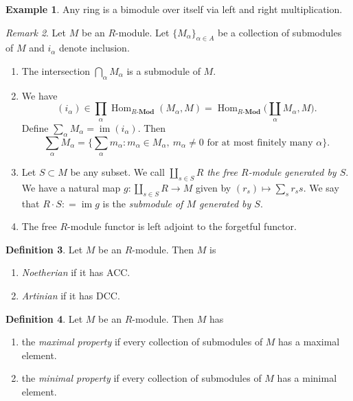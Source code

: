 \documentclass[10pt,letterpaper,cm]{nupset}
\theoremstyle{definition}
\newtheorem{definition}{Definition}[subsection]
\newtheorem{exmp}[definition]{Example}
\theoremstyle{theorem}
\theoremstyle{remark}
\newtheorem{remark}[definition]{Remark}
\newcommand{\1}{\mathbf{1}}
\newcommand{\0}{\vec 0}
\DeclareMathOperator{\im}{im}
\DeclareMathOperator{\Hom}{Hom}
\begin{document}
\begin{exmp}
Any ring is a bimodule over itself via left and right multiplication.
\end{exmp}

\begin{remark} Let $M$ be an $R$-module. Let $\{M_{\alpha}\}_{\alpha \in A}$ be a collection of submodules of $M$ and $i_{\alpha}$ denote inclusion.
\begin{enumerate}
\item The intersection $\bigcap_{\alpha} M_{\alpha}$ is a submodule of $M$. 
\item We have $$(i_{\alpha}) \in \prod_{\alpha}\Hom_{R\text{-}\mathbf{Mod}}(M_{\alpha}, M) = \Hom_{R\text{-}\mathbf{Mod}}\big (\coprod_{\alpha} M_{\alpha}, M\big ).$$ Define $\sum_{\alpha} M_{\alpha} = \im (i_{\alpha})$. Then $$\sum_{\alpha} M_{\alpha}  = \{\sum_{\alpha} m_{\alpha} : m_{\alpha} \in M_{\alpha}, \ m_{\alpha} \ne 0 \text{ for at most finitely many } \alpha\}.$$
\item Let $S\subset M$ be any subset. We call $\coprod_{s\in S} R$ \textit{the free $R$-module generated by $S$}. We have a natural map $g : \coprod_{s\in S} R \to M$ given by $(r_s) \mapsto \sum_s r_ss$. We say that $R \cdot S: = \im g$ is the \textit{submodule of $M$ generated by $S$}.
\item The free $R$-module functor is left adjoint to the forgetful functor.
\end{enumerate}
\end{remark}

\begin{definition} Let $M$ be an $R$-module. Then $M$ is
\begin{enumerate}
\item \textit{Noetherian} if it has ACC.
\item \textit{Artinian} if it has DCC.
\end{enumerate}
\end{definition}

\begin{definition} Let $M$ be an $R$-module. Then $M$ has
\begin{enumerate}
\item the \textit{maximal property} if every collection of submodules of $M$ has a maximal element.
\item the \textit{minimal property} if every collection of submodules of $M$ has a minimal element.
\end{enumerate}
\end{definition}
\end{document}

